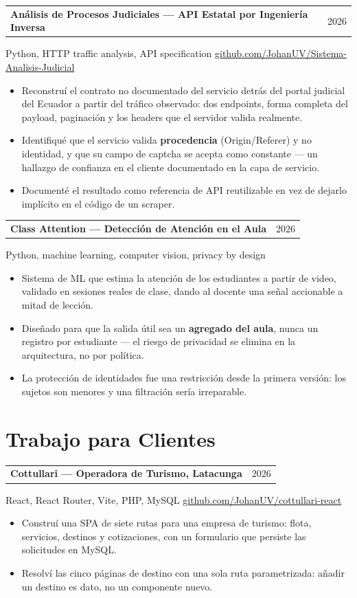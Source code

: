 \documentclass[10.5pt,a4paper]{article}
\makeatletter
\newcommand{\entry}[2]{%
  \begin{tabularx}{\linewidth}{@{}Xr@{}}
    \textbf{#1} & {\small\color{soft}#2}
  \end{tabularx}%
  \vspace{0.15em}
}
\newcommand{\subentry}[1]{{\small\color{muted}#1}\vspace{0.25em}}
\newenvironment{points}
  {\begin{itemize}[leftmargin=1.1em, itemsep=0.18em, topsep=0.25em, parsep=0pt, label=\textcolor{soft}{\footnotesize\textbullet}]}
  {\end{itemize}}
\makeatother
\begin{document}
\entry{Análisis de Procesos Judiciales --- API Estatal por Ingeniería Inversa}{2026}
\subentry{Python, HTTP traffic analysis, API specification \textbullet{} \href{https://github.com/JohanUV/Sistema-Analisis-Judicial}{github.com/JohanUV/Sistema-Analisis-Judicial}}
\begin{points}
  \item Reconstruí el contrato no documentado del servicio detrás del portal judicial del
        Ecuador a partir del tráfico observado: dos endpoints, forma completa del payload,
        paginación y los headers que el servidor valida realmente.
  \item Identifiqué que el servicio valida \textbf{procedencia} (Origin/Referer) y no identidad,
        y que su campo de captcha se acepta como constante --- un hallazgo de confianza en el
        cliente documentado en la capa de servicio.
  \item Documenté el resultado como referencia de API reutilizable en vez de dejarlo implícito
        en el código de un scraper.
\end{points}

\entry{Class Attention --- Detección de Atención en el Aula}{2026}
\subentry{Python, machine learning, computer vision, privacy by design}
\begin{points}
  \item Sistema de ML que estima la atención de los estudiantes a partir de video, validado en
        sesiones reales de clase, dando al docente una señal accionable a mitad de lección.
  \item Diseñado para que la salida útil sea un \textbf{agregado del aula}, nunca un registro por
        estudiante --- el riesgo de privacidad se elimina en la arquitectura, no por política.
  \item La protección de identidades fue una restricción desde la primera versión: los sujetos
        son menores y una filtración sería irreparable.
\end{points}

\section*{Trabajo para Clientes}

\entry{Cottullari --- Operadora de Turismo, Latacunga}{2026}
\subentry{React, React Router, Vite, PHP, MySQL \textbullet{} \href{https://github.com/JohanUV/cottullari-react}{github.com/JohanUV/cottullari-react}}
\begin{points}
  \item Construí una SPA de siete rutas para una empresa de turismo: flota, servicios, destinos
        y cotizaciones, con un formulario que persiste las solicitudes en MySQL.
  \item Resolví las cinco páginas de destino con una sola ruta parametrizada: añadir un destino
        es dato, no un componente nuevo.
\end{points}
\end{document}

